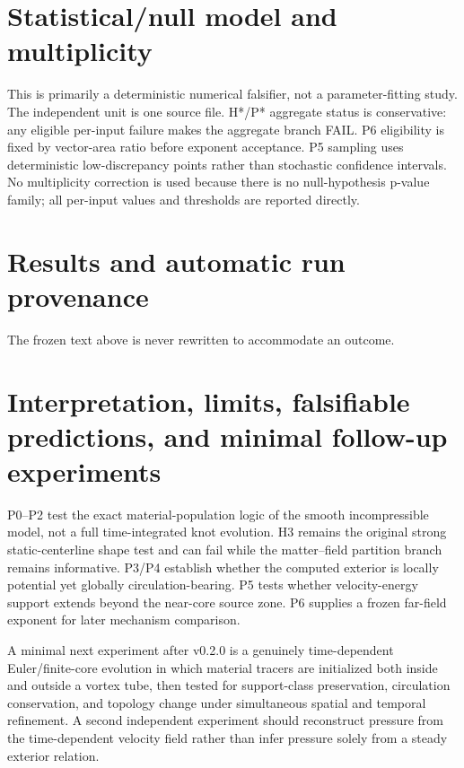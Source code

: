 \documentclass[11pt,a4paper]{article}
\begin{document}
\section{Statistical/null model and multiplicity}
This is primarily a deterministic numerical falsifier, not a parameter-fitting study. The independent unit is one source file. H*/P* aggregate status is conservative: any eligible per-input failure makes the aggregate branch FAIL. P6 eligibility is fixed by vector-area ratio before exponent acceptance. P5 sampling uses deterministic low-discrepancy points rather than stochastic confidence intervals. No multiplicity correction is used because there is no null-hypothesis p-value family; all per-input values and thresholds are reported directly.

\section{Results and automatic run provenance}
The frozen text above is never rewritten to accommodate an outcome.

\section{Interpretation, limits, falsifiable predictions, and minimal follow-up experiments}
P0--P2 test the exact material-population logic of the smooth incompressible model, not a full time-integrated knot evolution. H3 remains the original strong static-centerline shape test and can fail while the matter--field partition branch remains informative. P3/P4 establish whether the computed exterior is locally potential yet globally circulation-bearing. P5 tests whether velocity-energy support extends beyond the near-core source zone. P6 supplies a frozen far-field exponent for later mechanism comparison.

A minimal next experiment after v0.2.0 is a genuinely time-dependent Euler/finite-core evolution in which material tracers are initialized both inside and outside a vortex tube, then tested for support-class preservation, circulation conservation, and topology change under simultaneous spatial and temporal refinement. A second independent experiment should reconstruct pressure from the time-dependent velocity field rather than infer pressure solely from a steady exterior relation.
\end{document}

